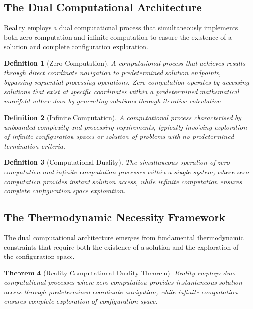 \documentclass[12pt,a4paper]{article}
\newtheorem{theorem}{Theorem}[section]
\newtheorem{definition}[theorem]{Definition}
\begin{document}
\subsection{The Dual Computational Architecture}

Reality employs a dual computational process that simultaneously implements both zero computation and infinite computation to ensure the existence of a solution and complete configuration exploration.

\begin{definition}[Zero Computation]
A computational process that achieves results through direct coordinate navigation to predetermined solution endpoints, bypassing sequential processing operations. Zero computation operates by accessing solutions that exist at specific coordinates within a predetermined mathematical manifold rather than by generating solutions through iterative calculation.
\end{definition}

\begin{definition}[Infinite Computation] 
A computational process characterised by unbounded complexity and processing requirements, typically involving exploration of infinite configuration spaces or solution of problems with no predetermined termination criteria.
\end{definition}

\begin{definition}[Computational Duality]
The simultaneous operation of zero computation and infinite computation processes within a single system, where zero computation provides instant solution access, while infinite computation ensures complete configuration space exploration.
\end{definition}

\subsection{The Thermodynamic Necessity Framework}

The dual computational architecture emerges from fundamental thermodynamic constraints that require both the existence of a solution and the exploration of the configuration space.

\begin{theorem}[Reality Computational Duality Theorem]
Reality employs dual computational processes where zero computation provides instantaneous solution access through predetermined coordinate navigation, while infinite computation ensures complete exploration of configuration space.
\end{theorem}
\end{document}
